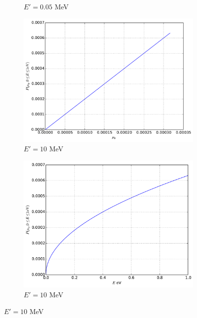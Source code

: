 \documentclass[12pt]{article}
\newenvironment{solution}[1][Solution]{\begin{trivlist}
\item[\hskip \labelsep {\bfseries #1} {\hspace{-0.2em}\bfseries:}]\hspace{0.3in}\newline}{\end{trivlist}}
\begin{document}
\begin{solution}
\begin{figure}[hb]
\begin{subfigure}{0.5\textwidth}
    \caption{$E'=0.05$ MeV}
\end{subfigure}
\begin{subfigure}{0.5\textwidth}
    \includegraphics[width=\textwidth]{scat_kernel_10.pdf}
    \caption{$E'=10$ MeV}
\end{subfigure}
\begin{subfigure}{0.5\textwidth}
    \includegraphics[width=\textwidth]{scat_kernel_E_10.pdf}
    \caption{$E'=10$ MeV}
\end{subfigure}
\end{figure}

 




 \end{solution}
\end{document}
